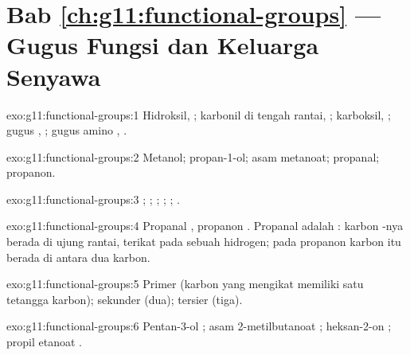 \section*{Bab \ref{ch:g11:functional-groups} --- Gugus Fungsi dan Keluarga Senyawa}

\begin{solution}{exo:g11:functional-groups:1}
Hidroksil, ; karbonil di tengah rantai, ; karboksil, ; gugus , ; gugus amino , .
\end{solution}

\begin{solution}{exo:g11:functional-groups:2}
Metanol; propan-1-ol; asam metanoat; propanal; propanon.
\end{solution}

\begin{solution}{exo:g11:functional-groups:3}
; ; ; ; ; .
\end{solution}

\begin{solution}{exo:g11:functional-groups:4}
Propanal , propanon . Propanal adalah
: karbon -nya berada di ujung rantai, terikat pada
sebuah  hidrogen; pada propanon karbon itu berada di antara dua 
karbon.
\end{solution}

\begin{solution}{exo:g11:functional-groups:5}
Primer (karbon yang mengikat  memiliki satu tetangga karbon);
sekunder (dua); tersier (tiga).
\end{solution}

\begin{solution}{exo:g11:functional-groups:6}
Pentan-3-ol ;
asam 2-metilbutanoat ;
heksan-2-on ;
propil etanoat .
\end{solution}

